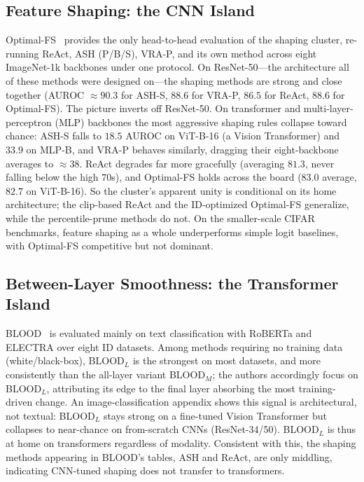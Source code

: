 \documentclass[a4paper]{article}
\begin{document}
\subsection{Feature Shaping: the CNN Island}
\label{subsec:exp-vision}

Optimal-FS~\citep{optimalfs} provides the only head-to-head evaluation of the shaping
cluster, re-running ReAct, ASH (P/B/S), VRA-P, and its own method across eight
ImageNet-1k backbones under one protocol. On ResNet-50---the architecture all of these
methods were designed on---the shaping methods are strong and close together (AUROC
$\approx 90.3$ for ASH-S, $88.6$ for VRA-P, $86.5$ for ReAct, $88.6$ for Optimal-FS).
The picture inverts off ResNet-50. On transformer and multi-layer-perceptron (MLP)
backbones the most aggressive shaping rules collapse toward chance: ASH-S falls to
$18.5$ AUROC on ViT-B-16 (a Vision Transformer) and
$33.9$ on MLP-B, and VRA-P behaves similarly, dragging their eight-backbone averages to
$\approx 38$. ReAct degrades far more gracefully (averaging $81.3$, never falling below
the high $70$s), and Optimal-FS holds across the board ($83.0$ average, $82.7$ on
ViT-B-16). So the cluster's apparent unity is conditional on its home architecture; the
clip-based ReAct and the ID-optimized Optimal-FS generalize, while the percentile-prune
methods do not. On the smaller-scale CIFAR benchmarks, feature shaping as a whole
underperforms simple logit baselines, with Optimal-FS competitive but not dominant.

\subsection{Between-Layer Smoothness: the Transformer Island}
\label{subsec:exp-text}

BLOOD~\citep{blood} is evaluated mainly on text classification with RoBERTa and
ELECTRA over eight ID datasets. Among methods requiring no training data
(white/black-box), BLOOD$_L$ is the strongest on most datasets, and more consistently
than the all-layer variant BLOOD$_M$; the authors accordingly focus on BLOOD$_L$,
attributing its edge to the final layer absorbing the most training-driven change. An
image-classification appendix shows this signal is architectural, not textual:
BLOOD$_L$ stays strong on a fine-tuned Vision Transformer but collapses to near-chance
on from-scratch CNNs (ResNet-34/50). BLOOD$_L$ is thus at home on transformers
regardless of modality. Consistent with this, the shaping methods appearing in BLOOD's tables, ASH and
ReAct, are only middling, indicating CNN-tuned shaping does not transfer to
transformers.
\end{document}
